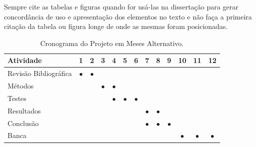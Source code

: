 \documentclass[
    12pt,				       %
    openright,			       %
    oneside,			       %
    a4paper,			       %
    chapter=TITLE,             %
    sumario=tradicional,       %
    english,			        %
    brazil, 				    %
 ]{abntex2}
\begin{document}
\begin{table}[htbp]
\end{table}%

Sempre cite as tabelas e figuras quando for usá-las na dissertação para gerar concordância de uso e apresentação dos elementos no texto e não faça a primeira citação da tabela ou figura longe de onde as mesmas foram posicionadas.

\begin{table}[!ht]
    \begin{center}
        \caption{Cronograma do Projeto em Meses Alternativo.}
        \label{tab:cronograma2}
        \begin{tabular}{lcccccccccccc} %
            \toprule
            \textbf{Atividade} & \textbf{1} & \textbf{2} & \textbf{3} & \textbf{4} & \textbf{5} & \textbf{6} & \textbf{7} & \textbf{8} & \textbf{9} & \textbf{10} & \textbf{11} & \textbf{12} \\
            \midrule
                Revisão Bibliográfica & $\bullet$ & $\bullet$ & & & & & & & & & & \\
                Métodos & & & $\bullet$ & $\bullet$ & & & & & & & & \\
                Testes & & & & $\bullet$ & $\bullet$ & $\bullet$ & & & & & & \\
                Resultados & & & & & & & $\bullet$ & $\bullet$ & & & & \\
                Conclusão & & & & & & & $\bullet$ & $\bullet$ & $\bullet$ & & & \\
                Banca & & & & & & &&&& $\bullet$ & $\bullet$ & $\bullet$ \\
            \bottomrule
        \end{tabular}%
    \end{center}
\end{table}
\end{document}

